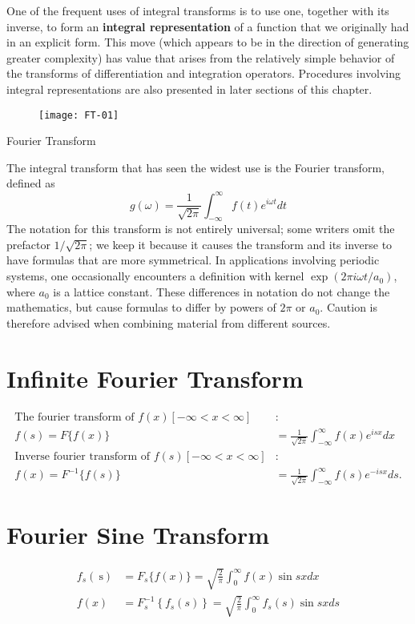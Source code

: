 One of the frequent uses of integral transforms is to use one, together with its inverse, to form an \textbf{integral representation} of a function that we originally had in an explicit form. This move (which appears to be in the direction of generating greater complexity) has value that arises from the relatively simple behavior of the transforms of differentiation and integration operators. Procedures involving integral representations are also presented in later sections of this chapter.
\begin{figure}[H]
	\centering
	\texttt{[image: FT-01]}
\end{figure}
\newpage
\begin{abox}
	Fourier Transform
	\end{abox}

The integral transform that has seen the widest use is the Fourier transform, defined as
\begin{equation}
g(\omega)=\frac{1}{\sqrt{2 \pi}} \int_{-\infty}^{\infty} f(t) e^{i \omega t} d t
\end{equation}
The notation for this transform is not entirely universal; some writers omit the prefactor $1 / \sqrt{2 \pi}$; we keep it because it causes the transform and its inverse to have formulas that are more symmetrical. In applications involving periodic systems, one occasionally encounters a definition with kernel $\exp \left(2 \pi i \omega t / a_{0}\right)$, where $a_{0}$ is a lattice constant. These differences in notation do not change the mathematics, but cause formulas to differ by powers of $2 \pi$ or $a_{0}$. Caution is therefore advised when combining material from different sources.\\
\section{Infinite Fourier Transform}
\begin{align*}
\text{The fourier transform of }f(x)[-\infty<x<\infty] &:\\
f(s)=F\{f(x)\}&=\frac{1}{\sqrt{2 \pi}} \int_{-\infty}^{\infty} f(x) e^{i s x} d x\\
\text{Inverse fourier transform of }f(s)[-\infty<x<\infty] &:\\
f(x)=F^{-1}\{f(s)\}&=\frac{1}{\sqrt{2 \pi}} \int_{-\infty}^{\infty} f(s) e^{-i s x} d s .
\end{align*}
\section{Fourier Sine Transform}
\begin{align*}
f_{s}(\mathrm{~s})&=F_{s}\{f(x)\}=\sqrt{\frac{2}{\pi}} \int_{0}^{\infty} f(x) \sin s x d x \\
f(x)&=F_{s}^{-1}\left\{f_{s}(s)\right\}=\sqrt{\frac{2}{\pi}} \int_{0}^{\infty} f_{s}(s) \sin s x d s
\end{align*}
